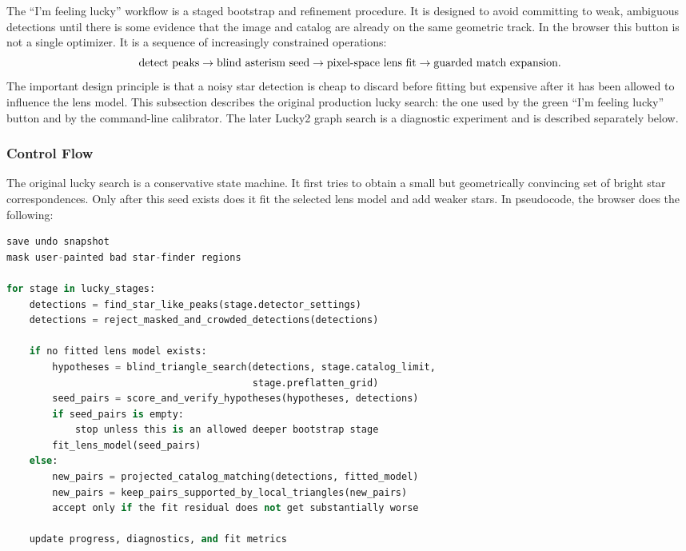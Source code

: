 \documentclass[11pt]{article}
\begin{document}
The ``I'm feeling lucky'' workflow is a staged bootstrap and refinement
procedure. It is designed to avoid committing to weak, ambiguous detections
until there is some evidence that the image and catalog are already on the
same geometric track. In the browser this button is not a single optimizer.
It is a sequence of increasingly constrained operations:
\[
  \hbox{detect peaks}
  \rightarrow
  \hbox{blind asterism seed}
  \rightarrow
  \hbox{pixel-space lens fit}
  \rightarrow
  \hbox{guarded match expansion}.
\]
The important design principle is that a noisy star detection is cheap to
discard before fitting but expensive after it has been allowed to influence the
lens model. This subsection describes the original production lucky search: the
one used by the green ``I'm feeling lucky'' button and by the command-line
calibrator. The later Lucky2 graph search is a diagnostic experiment and is
described separately below.

\subsubsection{Control Flow}

The original lucky search is a conservative state machine. It first tries to
obtain a small but geometrically convincing set of bright star correspondences.
Only after this seed exists does it fit the selected lens model and add weaker
stars. In pseudocode, the browser does the following:
\begin{lstlisting}[language=Python]
save undo snapshot
mask user-painted bad star-finder regions

for stage in lucky_stages:
    detections = find_star_like_peaks(stage.detector_settings)
    detections = reject_masked_and_crowded_detections(detections)

    if no fitted lens model exists:
        hypotheses = blind_triangle_search(detections, stage.catalog_limit,
                                           stage.preflatten_grid)
        seed_pairs = score_and_verify_hypotheses(hypotheses, detections)
        if seed_pairs is empty:
            stop unless this is an allowed deeper bootstrap stage
        fit_lens_model(seed_pairs)
    else:
        new_pairs = projected_catalog_matching(detections, fitted_model)
        new_pairs = keep_pairs_supported_by_local_triangles(new_pairs)
        accept only if the fit residual does not get substantially worse

    update progress, diagnostics, and fit metrics
\end{lstlisting}
\end{document}
